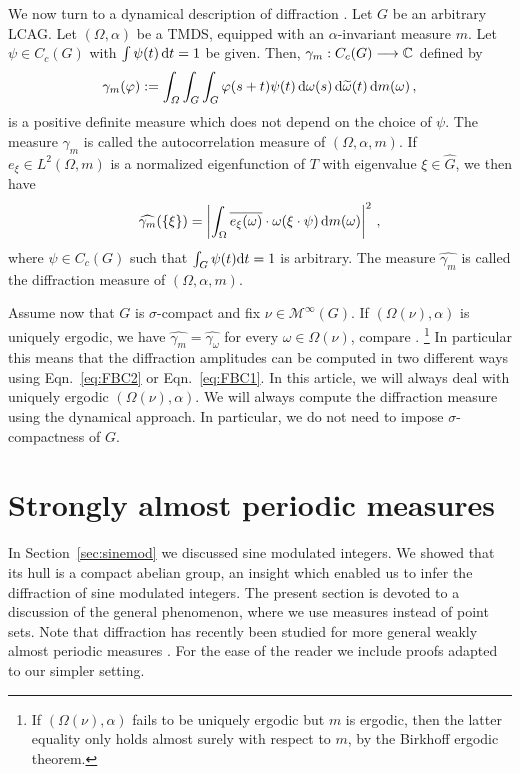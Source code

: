 \documentclass[11pt, a4wide]{amsart}
\newcommand{\ts}{\hspace{0.5pt}}
\newcommand{\CC}{\mathbb{C}\ts}
\newcommand{\dd}{\,{\rm d}}
\newcommand{\Oomega}{(\varOmega,\alpha)}
\numberwithin{lemma}{section}
\begin{document}
We now turn to a dynamical description of diffraction \cite{BL,Len}. Let $G$ be an arbitrary LCAG. Let $\Oomega$ be a TMDS, equipped with an $\alpha$-invariant measure $m$. Let $\psi \in C_c (G)$ with $\int \psi(t) \dd t =1$ be given. Then,
$\gamma_m : C_c (G) \longrightarrow \CC$ defined by
%
\[ \gamma_m (\varphi) := \int_\varOmega \int_G \int_G \varphi ( s + t) \psi
(t) \dd \omega(s) \dd \widetilde{\omega}(t) \dd m (\omega)\,,
\]
%
is a positive definite measure which does not depend on the choice of $\psi$. 
 The measure $\gamma_m$ is called the autocorrelation measure of $(\Omega, \alpha, m)$.  If $e_\xi\in L^2(\Omega, m)$ is a normalized eigenfunction of $T$ with eigenvalue $\xi\in \widehat G$, we then have
%
\begin{equation}\label{eq:FBC1}
\widehat{\gamma_m}(\{\xi\}) = \left|\int_{\Omega} \overline{e_\xi(\omega)} \cdot \omega(\xi\cdot\psi) \, {\rm d}m(\omega)\right|^2 \, ,
\end{equation}
%
where $\psi\in C_c(G)$ such that $\int_G \psi(t) {\rm d}t=1$ is arbitrary. The measure $\widehat{\gamma_m}$ is called the diffraction measure of $(\Omega, \alpha, m)$.

\smallskip



Assume now that $G$ is $\sigma$-compact and fix $\nu\in \mathcal M^\infty(G)$.  If $(\Omega(\nu),\alpha)$ is uniquely ergodic, we have $\widehat{\gamma_m}=\widehat{\gamma_\omega}$ for every $\omega\in \Omega(\nu)$, compare \cite[Thm.~3, Thm.~5]{Len}.%
%
\footnote{If $(\Omega(\nu),\alpha)$ fails to be uniquely ergodic but $m$ is ergodic, then the latter equality only holds almost surely with respect to $m$, by the Birkhoff ergodic theorem. }
%
In particular this means that the diffraction amplitudes can be computed in two different ways using Eqn.~\eqref{eq:FBC2} or Eqn.~\eqref{eq:FBC1}. 
In this article, we will always deal with uniquely ergodic $(\Omega(\nu),\alpha)$. We will always compute the diffraction measure using the dynamical approach. In particular, we do not need to impose $\sigma$-compactness of $G$.


\section{Strongly almost periodic measures}\label{Strongly}

In Section~\ref{sec:sinemod} we discussed sine modulated integers. We showed that its hull is a compact abelian group, an insight which enabled us to infer the diffraction of sine modulated integers. The present section is devoted to a discussion of the general phenomenon, where we use measures instead of point sets. Note that diffraction has recently been studied for more general weakly almost periodic measures \cite{LenStr16}. For the ease of the reader we include proofs adapted to our simpler setting.
\end{document}
